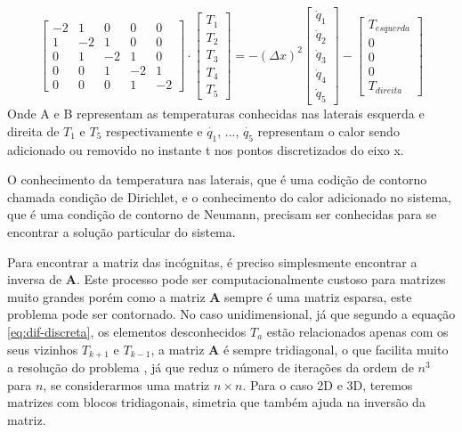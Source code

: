 \begin{equation}\label{eq:matricial}
 \begin{bmatrix}
    -2 & 1 & 0 & 0 & 0  
\\  1 & -2 & 1 & 0 & 0
\\  0 & 1 & -2 & 1 & 0
\\  0 & 0 & 1 & -2 & 1
\\  0 & 0 & 0 & 1 & -2
\end{bmatrix}  \cdot \begin{bmatrix}
    T_1 
\\  T_2
\\  T_3
\\  T_4
\\  T_5
\end{bmatrix} = -(\Delta x)^2  \begin{bmatrix}
    \dot{q}_1 
\\  \dot{q}_2
\\  \dot{q}_3
\\  \dot{q}_4
\\  \dot{q}_5
\end{bmatrix} - \begin{bmatrix}
    T_{esquerda}
\\  0
\\  0
\\  0
\\  T_{direita}
\end{bmatrix}
\end{equation}
Onde A e B representam as temperaturas conhecidas nas laterais esquerda e direita de $T_1$ e $T_5$ respectivamente e $\dot{q_1}$, ..., $\dot{q_5}$ representam o calor sendo adicionado ou removido no instante t nos pontos discretizados do eixo x.

O conhecimento da temperatura nas laterais, que é uma codição de contorno chamada condição de Dirichlet, e o conhecimento do calor adicionado no sistema, que é uma condição de contorno de Neumann, precisam ser conhecidas para se encontrar a solução particular do sistema.

Para encontrar a matriz das incógnitas, é preciso simplesmente encontrar a inversa de $\mathbf{A}$. Este processo pode ser computacionalmente custoso para matrizes muito grandes porém como a matriz $\mathbf{A}$ sempre é uma matriz esparsa, este problema pode ser contornado. No caso unidimensional, já que segundo a equação \ref{eq:dif-discreta}, os elementos desconhecidos $T_a$ estão relacionados apenas com os seus vizinhos $T_{k+1}$ e $T_{k-1}$,  a matriz $\mathbf{A}$ é sempre tridiagonal, o que facilita muito a resolução do problema \citep{tridiagonal}, já que reduz o número de iterações da ordem de $n^3$ para $n$, se considerarmos uma matriz $n \times n$. Para o caso 2D e 3D, teremos matrizes com blocos tridiagonais, simetria que também ajuda na inversão da matriz.

